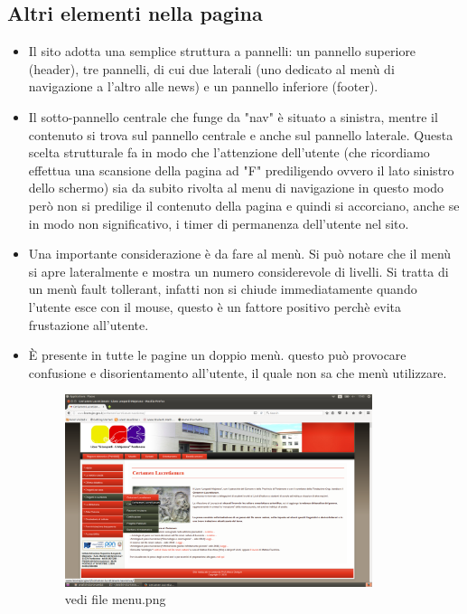 \documentclass[12pt]{article}
\begin{document}
\subsection{Altri elementi nella pagina}
\begin{itemize}
\item Il sito adotta una semplice struttura a pannelli: un pannello superiore (header), tre pannelli, di cui due laterali (uno dedicato al men\`u di navigazione a l'altro alle news) e un pannello inferiore (footer).  

\item Il sotto-pannello centrale che funge da "nav" \`e situato a sinistra, mentre il contenuto si trova sul pannello centrale e anche sul pannello laterale.
 Questa scelta strutturale fa in modo che l'attenzione dell'utente (che ricordiamo effettua una scansione della pagina ad "F" prediligendo ovvero il lato sinistro dello schermo) sia da subito rivolta al menu di navigazione in questo modo per\`o non si predilige il contenuto della pagina e quindi si accorciano, anche se in modo non significativo, i timer di permanenza dell'utente nel sito.

 \item Una importante considerazione \`e  da fare al men\`u. Si pu\`o notare che il men\`u si apre lateralmente e mostra un numero considerevole di livelli. Si tratta di un men\`u fault tollerant, infatti non si chiude immediatamente quando l'utente esce con il mouse, questo \`e  un fattore positivo perch\`e evita frustazione all'utente.

 \item \`E presente in tutte le pagine un doppio men\`u. questo pu\`o provocare confusione e disorientamento all'utente, il quale non sa che men\`u utilizzare.

\begin{figure}[ht!]
\centering
\includegraphics[width=90mm]{menu}
\caption{vedi file menu.png}
\end{figure} 

\end{itemize}
\end{document}
